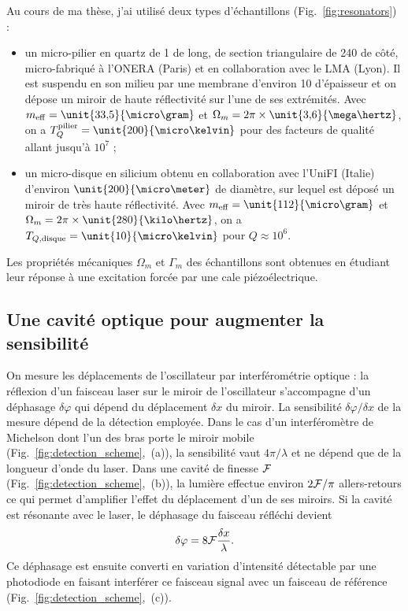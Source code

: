 \documentclass[12pt,a4paper]{article}
\begin{document}
Au cours de ma thèse, j'ai utilisé deux types d'échantillons (Fig.~\ref{fig:resonators}) :
\begin{itemize}
\item un micro-pilier en quartz de \unit{1}{\milli\meter} de long, de section triangulaire de \unit{240}{\micro\meter} de côté, micro-fabriqué à l'ONERA (Paris) et en collaboration avec le LMA (Lyon).
Il est suspendu en son milieu par une membrane d'environ \unit{10}{\micro\meter} d'épaisseur et on dépose un miroir de haute réflectivité sur l'une de ses extrémités.
Avec $m_\mathrm{eff}=\unit{33{,}5}{\micro\gram}$ et $\Omega_m=2\pi\times\unit{3{,}6}{\mega\hertz}$, on a $T_{Q}^\mathrm{pilier} = \unit{200}{\micro\kelvin}$ pour des facteurs de qualité allant jusqu'à $10^7$ ;
\item un micro-disque en silicium obtenu en collaboration avec l'UniFI (Italie) d'environ $\unit{200}{\micro\meter}$ de diamètre, sur lequel est déposé un miroir de très haute réflectivité.
Avec $m_\mathrm{eff}=\unit{112}{\micro\gram}$ et $\Omega_m=2\pi\times\unit{280}{\kilo\hertz}$, on a $T_{Q,\mathrm{disque}} = \unit{10}{\micro\kelvin}$ pour $Q\approx10^6$.
\end{itemize}
Les propriétés mécaniques $\Omega_m$ et $\Gamma_m$ des échantillons sont obtenues en étudiant leur réponse à une excitation forcée par une cale piézoélectrique.

\subsection{Une cavité optique pour augmenter la sensibilité}
\label{sec:cavity}

On mesure les déplacements de l'oscillateur par interférométrie optique : la réflexion d'un faisceau laser sur le miroir de l'oscillateur s'accompagne d'un déphasage $\delta\varphi$ qui dépend du déplacement $\delta x$ du miroir.
La sensibilité $\delta\varphi / \delta x$ de la mesure dépend de la détection employée.
Dans le cas d'un interféromètre de Michelson dont l'un des bras porte le miroir mobile (Fig.~\ref{fig:detection_scheme},~(a)), la sensibilité vaut $4\pi/\lambda$ et ne dépend que de la longueur d'onde du laser.
Dans une cavité de finesse $\cal{F}$ (Fig.~\ref{fig:detection_scheme},~(b)), la lumière effectue environ $2\cal{F}/\pi$ allers-retours ce qui permet d'amplifier l'effet du déplacement d'un de ses miroirs.
Si la cavité est résonante avec le laser, le déphasage du faisceau réfléchi devient
\begin{equation}
\delta \varphi = 8{\cal{F}}\frac{\delta x}{\lambda}.
\end{equation}
Ce déphasage est ensuite converti en variation d'intensité détectable par une photodiode en faisant interférer ce faisceau signal avec un faisceau de référence (Fig.~\ref{fig:detection_scheme},~(c)).
\end{document}
